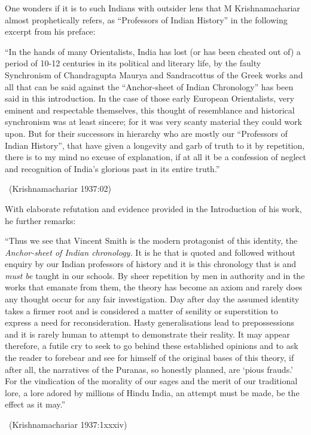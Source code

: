 One wonders if it is to such Indians with outsider lens that M Krishnamachariar almost prophetically refers, as “Professors of Indian History” in the following excerpt from his preface:

\begin{myquote}
“In the hands of many Orientalists, India has lost (or has been cheated out of) a period of 10-12 centuries in its political and literary life, by the faulty Synchronism of Chandragupta Maurya and Sandracottus of the Greek works and all that can be said against the “Anchor-sheet of Indian Chronology” has been said in this introduction. In the case of those early European Orientalists, very eminent and respectable themselves, this thought of resemblance and historical synchronism was at least sincere; for it was very scanty material they could work upon. But for their successors in hierarchy who are mostly our “Professors of Indian History”, that have given a longevity and garb of truth to it by repetition, there is to my mind no excuse of explanation, if at all it be a confession of neglect and recognition of India’s glorious past in its entire truth.” 

~\hfill (Krishnamachariar 1937:02)
\end{myquote}

With elaborate refutation and evidence provided in the Introduction of his work, he further remarks:

\begin{myquote}
“Thus we see that Vincent Smith is the modern protagonist of this identity, the \textit{Anchor-sheet of Indian chronology.} It is he that is quoted and followed without enquiry by our Indian professors of history and it is this chronology that is and \textit{must be} taught in our schools. By sheer repetition by men in authority and in the works that emanate from them, the theory has become an axiom and rarely does any thought occur for any fair investigation. Day after day the assumed identity takes a firmer root and is considered a matter of senility or superstition to express a need for reconsideration. Hasty generalisations lead to prepossessions and it is rarely human to attempt to demonstrate their reality. It may appear therefore, a futile cry to seek to go behind these established opinions and to ask the reader to forebear and see for himself of the original bases of this theory, if after all, the narratives of the Puranas, so honestly planned, are ‘pious frauds.’ For the vindication of the morality of our sages and the merit of our traditional lore, a lore adored by millions of Hindu India, an attempt must be made, be the effect as it may.” 

~\hfill (Krishnamachariar 1937:1xxxiv)
\end{myquote}

